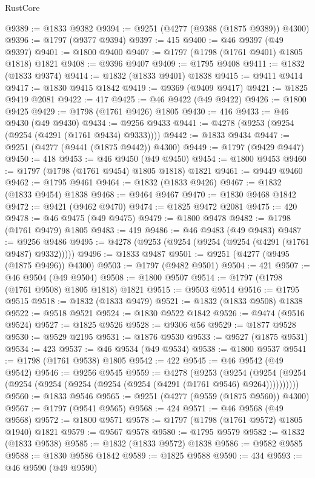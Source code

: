\begin{lexlean}{RustCore}
\begin{coremodule}
@9389 := @1833 @9382
@9394 := @9251 (@4277 (@9388 (@1875 @9389)) @4300)
@9396 := @1797 (@9377 @9394)
@9397 := 415
@9400 := @46 @9397 (@49 @9397)
@9401 := @1800 @9400
@9407 := @1797 (@1798 (@1761 @9401) @1805 @1818) @1821
@9408 := @9396 @9407
@9409 := @1795 @9408
@9411 := @1832 (@1833 @9374)
@9414 := @1832 (@1833 @9401) @1838
@9415 := @9411 @9414
@9417 := @1830 @9415 @1842
@9419 := @9369 (@9409 @9417)
@9421 := @1825 @9419 @2081
@9422 := 417
@9425 := @46 @9422 (@49 @9422)
@9426 := @1800 @9425
@9429 := @1798 (@1761 @9426) @1805
@9430 := 416
@9433 := @46 @9430 (@49 @9430)
@9434 := @9256 @9433
@9441 := @4278 (@9253 (@9254 (@9254 (@4291 (@1761 @9434) @9333))))
@9442 := @1833 @9434
@9447 := @9251 (@4277 (@9441 (@1875 @9442)) @4300)
@9449 := @1797 (@9429 @9447)
@9450 := 418
@9453 := @46 @9450 (@49 @9450)
@9454 := @1800 @9453
@9460 := @1797 (@1798 (@1761 @9454) @1805 @1818) @1821
@9461 := @9449 @9460
@9462 := @1795 @9461
@9464 := @1832 (@1833 @9426)
@9467 := @1832 (@1833 @9454) @1838
@9468 := @9464 @9467
@9470 := @1830 @9468 @1842
@9472 := @9421 (@9462 @9470)
@9474 := @1825 @9472 @2081
@9475 := 420
@9478 := @46 @9475 (@49 @9475)
@9479 := @1800 @9478
@9482 := @1798 (@1761 @9479) @1805
@9483 := 419
@9486 := @46 @9483 (@49 @9483)
@9487 := @9256 @9486
@9495 := @4278 (@9253 (@9254 (@9254 (@9254 (@4291 (@1761 @9487) @9332)))))
@9496 := @1833 @9487
@9501 := @9251 (@4277 (@9495 (@1875 @9496)) @4300)
@9503 := @1797 (@9482 @9501)
@9504 := 421
@9507 := @46 @9504 (@49 @9504)
@9508 := @1800 @9507
@9514 := @1797 (@1798 (@1761 @9508) @1805 @1818) @1821
@9515 := @9503 @9514
@9516 := @1795 @9515
@9518 := @1832 (@1833 @9479)
@9521 := @1832 (@1833 @9508) @1838
@9522 := @9518 @9521
@9524 := @1830 @9522 @1842
@9526 := @9474 (@9516 @9524)
@9527 := @1825 @9526
@9528 := @9306 @56
@9529 := @1877 @9528
@9530 := @9529 @2195
@9531 := @1876 @9530
@9533 := @9527 (@1875 @9531)
@9534 := 423
@9537 := @46 @9534 (@49 @9534)
@9538 := @1800 @9537
@9541 := @1798 (@1761 @9538) @1805
@9542 := 422
@9545 := @46 @9542 (@49 @9542)
@9546 := @9256 @9545
@9559 := @4278
    (@9253
      (@9254 (@9254 (@9254 (@9254 (@9254 (@9254 (@9254 (@9254 (@4291 (@1761 @9546) @9264))))))))))
@9560 := @1833 @9546
@9565 := @9251 (@4277 (@9559 (@1875 @9560)) @4300)
@9567 := @1797 (@9541 @9565)
@9568 := 424
@9571 := @46 @9568 (@49 @9568)
@9572 := @1800 @9571
@9578 := @1797 (@1798 (@1761 @9572) @1805 @1940) @1821
@9579 := @9567 @9578
@9580 := @1795 @9579
@9582 := @1832 (@1833 @9538)
@9585 := @1832 (@1833 @9572) @1838
@9586 := @9582 @9585
@9588 := @1830 @9586 @1842
@9589 := @1825 @9588
@9590 := 434
@9593 := @46 @9590 (@49 @9590)

\end{coremodule}
\end{lexlean}
